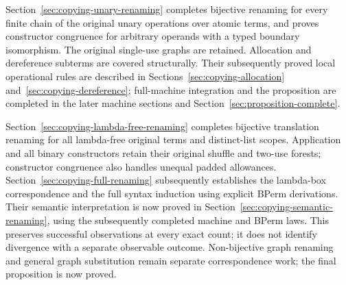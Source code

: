 Section~\ref{sec:copying-unary-renaming} completes bijective renaming for every
finite chain of the original unary operations over atomic terms, and proves
constructor congruence for arbitrary operands with a typed boundary isomorphism.
The original single-use graphs are retained. Allocation and dereference subterms
are covered structurally. Their subsequently proved local operational rules are
described in Sections~\ref{sec:copying-allocation} and~\ref{sec:copying-dereference};
full-machine integration and the proposition are completed in the later
machine sections and Section~\ref{sec:proposition-complete}.


Section~\ref{sec:copying-lambda-free-renaming} completes bijective translation
renaming for all lambda-free original terms and distinct-list scopes. Application
and all binary constructors retain their original shuffle and two-use forests;
constructor congruence also handles unequal padded allowances. Section~\ref{sec:copying-full-renaming}
subsequently establishes the lambda-box correspondence and the full syntax
induction using explicit BPerm derivations. Their semantic interpretation is
now proved in Section~\ref{sec:copying-semantic-renaming}, using the subsequently
completed machine and BPerm laws. This preserves successful observations at
every exact count; it does not identify divergence with a separate observable
outcome. Non-bijective graph renaming and general graph substitution remain
separate correspondence work; the final proposition is now proved.
